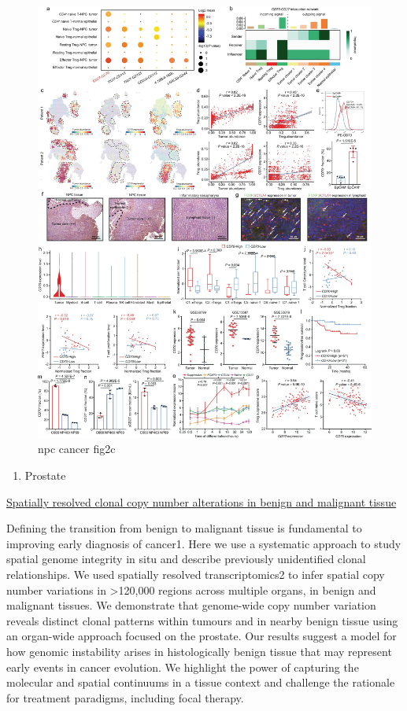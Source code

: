 \documentclass[
]{book}
\providecommand{\tightlist}{%
  \setlength{\itemsep}{0pt}\setlength{\parskip}{0pt}}
\begin{document}
\begin{figure}
\centering
\includegraphics{./figs/spatialDatasets/NPC_Fig2_HTML.webp}
\caption{npc cancer fig2c}
\end{figure}

\begin{enumerate}
\def\labelenumi{\arabic{enumi}.}
\setcounter{enumi}{5}
\tightlist
\item
  Prostate
\end{enumerate}

\href{https://www.nature.com/articles/s41586-022-05023-2}{Spatially resolved clonal copy number alterations in benign and malignant tissue}

Defining the transition from benign to malignant tissue is fundamental to improving early diagnosis of cancer1. Here we use a systematic approach to study spatial genome integrity in situ and describe previously unidentified clonal relationships. We used spatially resolved transcriptomics2 to infer spatial copy number variations in \textgreater120,000 regions across multiple organs, in benign and malignant tissues. We demonstrate that genome-wide copy number variation reveals distinct clonal patterns within tumours and in nearby benign tissue using an organ-wide approach focused on the prostate. Our results suggest a model for how genomic instability arises in histologically benign tissue that may represent early events in cancer evolution. We highlight the power of capturing the molecular and spatial continuums in a tissue context and challenge the rationale for treatment paradigms, including focal therapy.\citep{erickson2022spatially}
\end{document}
